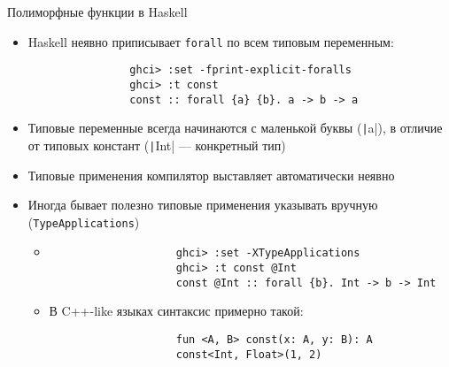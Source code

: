     \begin{frame}[fragile]{Полиморфные функции в Haskell \advancedslide}
        \begin{itemize}
            \item Haskell неявно приписывает \texttt{forall} по всем типовым переменным:
            \begin{verbatim}
                ghci> :set -fprint-explicit-foralls
                ghci> :t const
                const :: forall {a} {b}. a -> b -> a
            \end{verbatim}
            \item Типовые переменные всегда начинаются с маленькой буквы (\texttt|a|), в отличие от типовых констант (\texttt|Int| --- конкретный тип)
            \item Типовые применения компилятор выставляет автоматически неявно
            \item Иногда бывает полезно типовые применения указывать вручную (\texttt{TypeApplications})
            \begin{itemize}
                \item
                \begin{verbatim}
                    ghci> :set -XTypeApplications
                    ghci> :t const @Int
                    const @Int :: forall {b}. Int -> b -> Int
                \end{verbatim}
                \item В C++-like языках синтаксис примерно такой:
                \begin{verbatim}
                    fun <A, B> const(x: A, y: B): A
                    const<Int, Float>(1, 2)
                \end{verbatim}
            \end{itemize}
        \end{itemize}
    \end{frame}


